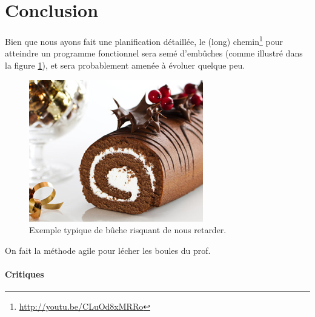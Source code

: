 \section{Conclusion}
	\label{sec:conclusion}

	Bien que nous ayons fait une planification détaillée, le (long) chemin\footnote{\url{http://youtu.be/CLuOd8xMRRo}} pour atteindre un programme fonctionnel sera semé d'embûches (comme illustré dans la figure \ref{fig:buche}), et sera probablement amenée à évoluer quelque peu.

	\begin{figure}
		\centering
		\includegraphics{figure/buche.jpg}
		\caption{Exemple typique de bûche risquant de nous retarder.}
		\label{fig:buche}
	\end{figure}


	On fait la méthode agile pour lécher les boules du prof.

	\paragraph{Critiques}
		